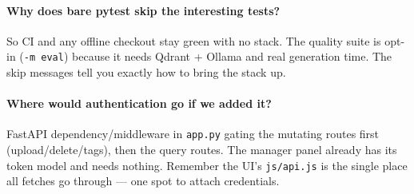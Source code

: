 \documentclass[11pt,letterpaper]{article}
\begin{document}
\paragraph{Why does bare pytest skip the interesting tests?}
So CI and any offline checkout stay green with no stack. The quality suite
is opt-in (\texttt{-m eval}) because it needs Qdrant + Ollama and real
generation time. The skip messages tell you exactly how to bring the stack
up.

\paragraph{Where would authentication go if we added it?}
FastAPI dependency/middleware in \texttt{app.py} gating the mutating routes
first (upload/delete/tags), then the query routes. The manager panel
already has its token model and needs nothing. Remember the UI's
\texttt{js/api.js} is the single place all fetches go through --- one spot
to attach credentials.
\end{document}
